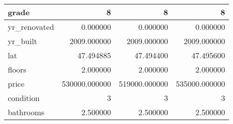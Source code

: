 \begin{table}[H]
\begin{tabular}{|l|r|r|r|}
\hline grade & \cellcolor[rgb]{0.9, 0.54, 0.52} 8 & \cellcolor[rgb]{0.9, 0.54, 0.52} 8 & \cellcolor[rgb]{0.9, 0.54, 0.52} 8 \\
\hline yr\_renovated & \cellcolor[rgb]{0.9, 0.54, 0.52} 0.000000 & \cellcolor[rgb]{0.9, 0.54, 0.52} 0.000000 & \cellcolor[rgb]{0.9, 0.54, 0.52} 0.000000 \\
\hline yr\_built & \cellcolor[rgb]{0.9, 0.54, 0.52} 2009.000000 & \cellcolor[rgb]{0.9, 0.54, 0.52} 2009.000000 & \cellcolor[rgb]{0.9, 0.54, 0.52} 2009.000000 \\
\hline lat & \cellcolor[rgb]{0.9, 0.54, 0.52} 47.494885 & 47.494400 & 47.495600 \\
\hline floors & \cellcolor[rgb]{0.9, 0.54, 0.52} 2.000000 & \cellcolor[rgb]{0.9, 0.54, 0.52} 2.000000 & \cellcolor[rgb]{0.9, 0.54, 0.52} 2.000000 \\
\hline price & \cellcolor[rgb]{0.9, 0.54, 0.52} 530000.000000 & 519000.000000 & 535000.000000 \\
\hline condition & \cellcolor[rgb]{0.9, 0.54, 0.52} 3 & \cellcolor[rgb]{0.9, 0.54, 0.52} 3 & \cellcolor[rgb]{0.9, 0.54, 0.52} 3 \\
\hline bathrooms & \cellcolor[rgb]{0.9, 0.54, 0.52} 2.500000 & \cellcolor[rgb]{0.9, 0.54, 0.52} 2.500000 & \cellcolor[rgb]{0.9, 0.54, 0.52} 2.500000 \\
\hline
\end{tabular}
\end{table}
